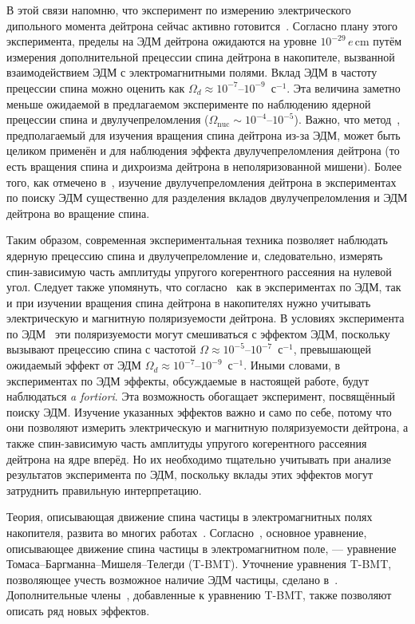 \documentclass[11pt,a4paper]{article}
\begin{document}
В этой связи напомню, что эксперимент по измерению электрического
дипольного момента дейтрона сейчас активно готовится~\cite{Onderwater05,Farley04,Orlov05}.
Согласно плану этого эксперимента, пределы на ЭДМ дейтрона ожидаются
на уровне $10^{-29}\,e\,\mathrm{cm}$ путём измерения дополнительной
прецессии спина дейтрона в накопителе, вызванной взаимодействием ЭДМ
с электромагнитными полями. Вклад ЭДМ в частоту прецессии спина можно
оценить как $\Omega_d\approx 10^{-7}$--$10^{-9}$~с$^{-1}$. Эта величина
заметно меньше ожидаемой в предлагаемом эксперименте по наблюдению
ядерной прецессии спина и двулучепреломления
($\Omega_{\mathrm{nuc}}\sim 10^{-4}$--$10^{-5}$). Важно, что метод~\cite{Onderwater05,Farley04,Orlov05},
предполагаемый для изучения вращения спина дейтрона из-за ЭДМ, может
быть целиком применён и для наблюдения эффекта двулучепреломления
дейтрона (то есть вращения спина и дихроизма дейтрона в неполяризованной
мишени). Более того, как отмечено в~\cite{BarySTORI05}, изучение
двулучепреломления дейтрона в экспериментах по поиску ЭДМ существенно
для разделения вкладов двулучепреломления и ЭДМ дейтрона во вращение спина.

Таким образом, современная экспериментальная техника позволяет наблюдать
ядерную прецессию спина и двулучепреломление и, следовательно, измерять
спин-зависимую часть амплитуды упругого когерентного рассеяния на нулевой
угол. Следует также упомянуть, что согласно~\cite{BarySTORI05,BaryShirvel05,Bary0504064,BaryGurin05}
как в экспериментах по ЭДМ, так и при изучении вращения спина дейтрона
в накопителях нужно учитывать электрическую и магнитную поляризуемости
дейтрона. В условиях эксперимента по ЭДМ~\cite{Onderwater05,Farley04,Orlov05}
эти поляризуемости могут смешиваться с эффектом ЭДМ, поскольку вызывают
прецессию спина с частотой $\Omega\approx 10^{-5}$--$10^{-7}$~с$^{-1}$,
превышающей ожидаемый эффект от ЭДМ $\Omega_d\approx 10^{-7}$--$10^{-9}$~с$^{-1}$.
Иными словами, в экспериментах по ЭДМ эффекты, обсуждаемые в настоящей
работе, будут наблюдаться \emph{a fortiori}. Эта возможность обогащает
эксперимент, посвящённый поиску ЭДМ. Изучение указанных эффектов важно
и само по себе, потому что они позволяют измерить электрическую и магнитную
поляризуемости дейтрона, а также спин-зависимую часть амплитуды упругого
когерентного рассеяния дейтрона на ядре вперёд. Но их необходимо тщательно
учитывать при анализе результатов эксперимента по ЭДМ, поскольку вклады
этих эффектов могут затруднить правильную интерпретацию.

Теория, описывающая движение спина частицы в электромагнитных полях
накопителя, развита во многих работах~\cite{Jackson76,Derbenev73,Hoffstaetter06,Hoffstaetter00,Heinemann01,Mane05}.
Согласно~\cite{Jackson76,Derbenev73,Hoffstaetter06,Hoffstaetter00,Heinemann01,Mane05},
основное уравнение, описывающее движение спина частицы в электромагнитном
поле, --- уравнение Томаса--Баргманна--Мишеля--Телегди (T-BMT).
Уточнение уравнения T-BMT, позволяющее учесть возможное наличие ЭДМ
частицы, сделано в~\cite{Mane05,FordHirt61}. Дополнительные члены~\cite{BaryShirvel05,Bary0504064,BaryGurin05},
добавленные к уравнению T-BMT, также позволяют описать ряд новых эффектов.
\end{document}
